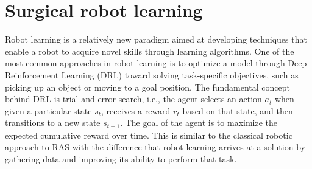 \documentclass[fleqn,10pt]{wlscirep}\twocolumn
\begin{document}



\section*{Surgical robot learning}

Robot learning is a relatively new paradigm aimed at developing techniques that enable a robot to acquire novel skills through learning algorithms. 
One of the most common approaches in robot learning is to optimize a model through Deep Reinforcement Learning (DRL)\cite{arulkumaran2017brief} toward solving task-specific objectives, such as picking up an object or moving to a goal position. 
The fundamental concept behind DRL is trial-and-error search, i.e., the agent selects an action $a_t$ when given a particular state $s_t$, receives a reward $r_t$ based on that state, and then transitions to a new state $s_{t+1}$. The goal of the agent is to maximize the expected cumulative reward over time.
This is similar to the classical robotic approach to RAS with the difference that robot learning arrives at a solution by gathering data and improving its ability to perform that task. 
\end{document}
